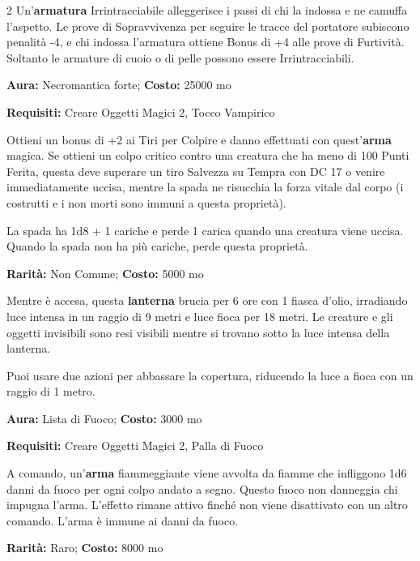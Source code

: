 \begin{multicols}{2}
Un'\textbf{armatura} Irrintracciabile alleggerisce i passi di chi la indossa e ne camuffa l'aspetto. Le prove di Sopravvivenza per seguire le tracce del portatore subiscono penalità -4, e chi indossa l'armatura ottiene Bonus di +4 alle prove di Furtività. Soltanto le armature di cuoio o di pelle possono essere Irrintracciabili.


\textbf{Aura:} Necromantica forte; \textbf{Costo:} 25000 mo

\textbf{Requisiti:} Creare Oggetti Magici 2, Tocco Vampirico

Ottieni un bonus di +2 ai Tiri per Colpire e danno effettuati con quest'\textbf{arma} magica. Se ottieni un colpo critico contro una creatura che ha meno di 100 Punti Ferita, questa deve superare un tiro Salvezza su Tempra con DC 17 o venire immediatamente uccisa, mentre la spada ne risucchia la forza vitale dal corpo (i costrutti e i non morti sono immuni a questa proprietà).

La spada ha 1d8 + 1 cariche e perde 1 carica quando una creatura viene uccisa. Quando la spada non ha più cariche, perde questa proprietà.


\textbf{Rarità:} Non Comune; \textbf{Costo:} 5000 mo

Mentre è accesa, questa \textbf{lanterna} brucia per 6 ore con 1 fiasca d'olio, irradiando luce intensa in un raggio di 9 metri e luce fioca per 18 metri. Le creature e gli oggetti invisibili sono resi visibili mentre si trovano sotto la luce intensa della lanterna.

Puoi usare due azioni per abbassare la copertura, riducendo la luce a fioca con un raggio di 1 metro.


\textbf{Aura:} Lista di Fuoco; \textbf{Costo:} 3000 mo

\textbf{Requisiti:} Creare Oggetti Magici 2, Palla di Fuoco

A comando, un'\textbf{arma} fiammeggiante viene avvolta da fiamme che infliggono 1d6 danni da fuoco per ogni colpo andato a segno. Questo fuoco non danneggia chi impugna l'arma. L'effetto rimane attivo finché non viene disattivato con un altro comando. L'arma è immune ai danni da fuoco.


\textbf{Rarità:} Raro; \textbf{Costo:} 8000 mo


\end{multicols}
